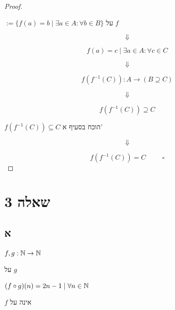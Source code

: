 \documentclass{article}
\begin{document}
\begin{proof}
    \begin{define}
        $ := \{ f(a) = b \; | \; \exists a \in A : \forall b \in B \} $
        על $f$
    \end{define}
    
    \[ \Downarrow \]
    
    \[
        f(a) = c \; | \; \exists a \in A : \forall c \in C
    \]
    
    \[ \Downarrow \]
    
    \[
        f(f^{-1}(C)) : A \rightarrow (B \supseteq C)
    \]
    
    \[ \Downarrow \]
    
    \begin{lem}
        \[
            \boxed{f(f^{-1}(C)) \supseteq C}
        \]
    \end{lem}
    
    \begin{lem}
        $ f(f^{-1}(C)) \subseteq C $    הוכח בסעיף א'
    \end{lem}
    
    \[ \Downarrow \]

    \[
        f(f^{-1}(C)) = C \hspace{1cm} \square
    \]
\end{proof}

\newpage

\section*{שאלה 3}

\subsection*{א}

\begin{letyehi}
    $ f, g : \Bbb{N} \rightarrow \Bbb{N} $
\end{letyehi}

\begin{remark}
    על $g$
\end{remark}

\begin{remark}
    $(f \circ g)(n) = 2n - 1 \; | \; \forall n \in \Bbb{N} $
\end{remark}

\begin{ntp}
    $f$ אינה על
\end{ntp}
\end{document}
